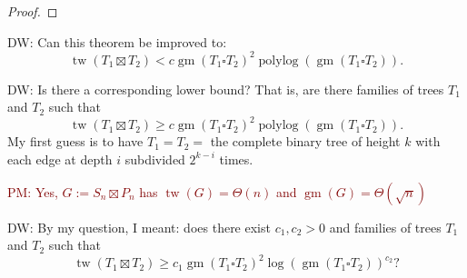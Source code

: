 \documentclass[kpfonts,lotsofwhite]{patmorin}
\renewcommand{\geq}{\geqslant}
\renewcommand{\leq}{\leqslant}
\DeclareMathOperator{\polylog}{polylog}
\DeclareMathOperator{\tw}{tw}
\DeclareMathOperator{\gm}{gm}
\newcommand{\david}[1]{{\color{orange} DW: #1}}
\newcommand{\pat}[1]{\textcolor{Maroon}{PM: #1}}
\theoremstyle{plain}
\theoremstyle{definition}
\begin{document}
\begin{proof}



\end{proof}

\david{Can this theorem be improved to:
$$\tw(T_1\boxtimes T_2) < c \gm(T_1\square T_2)^2 \polylog(\gm(T_1\square T_2)).$$}

\david{Is there a corresponding lower bound?
That is, are there families of trees $T_1$ and $T_2$ such that
$$\tw(T_1\boxtimes T_2) \geq  c \gm(T_1\square T_2)^2 \polylog(\gm(T_1\square T_2)).$$
My first guess is to have $T_1=T_2=$ the complete binary tree of height $k$ with each edge at depth $i$ subdivided $2^{k-i}$ times.
}

\pat{Yes, $G:=S_n\boxtimes P_n$ has $\tw(G)=\Theta(n)$ and $\gm(G)=\Theta(\sqrt{n})$}

\david{By my question, I meant: does there exist $c_1,c_2>0$ and families of trees $T_1$ and $T_2$ such that
$$\tw(T_1\boxtimes T_2) \geq  c_1 \gm(T_1\square T_2)^2 \log(\gm(T_1\square T_2))^{c_2}?$$
}
\end{document}
